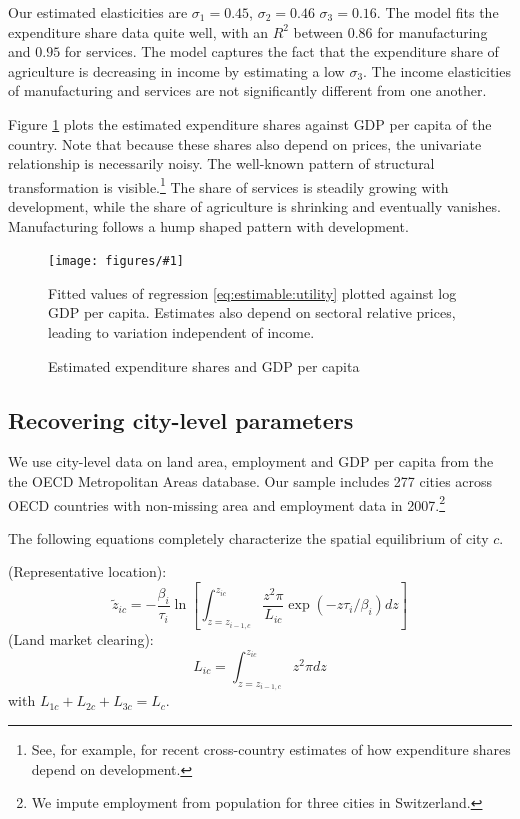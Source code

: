 \documentclass[12pt]{article}
\newcommand{\dofigure}[3]{\begin{figure}
\begin{centering}
\texttt{[image: figures/\#1]}
  \caption{#2\label{fig:#1}}
\end{centering}

\noindent \footnotesize{#3}
\end{figure}}
\begin{document}
Our estimated elasticities are $\sigma_1=0.45$, $\sigma_2=0.46$ $\sigma_3=0.16$. The model fits the expenditure share data quite well, with an $R^2$ between $0.86$ for manufacturing and $0.95$ for services. The model captures the fact that the expenditure share of agriculture is decreasing in income by estimating a low $\sigma_3$. The income elasticities of manufacturing and services are not significantly different from one another. 

Figure \ref{fig:city_level_inputs/expenditure_shares} plots the estimated expenditure shares against GDP per capita of the country. Note that because these shares also depend on prices, the univariate relationship is necessarily noisy. The well-known pattern of structural transformation is visible.\footnote{See, for example,  for recent cross-country estimates of how expenditure shares depend on development.} The share of services is steadily growing with development, while the share of agriculture is shrinking and eventually vanishes. Manufacturing follows a hump shaped pattern with development.

\dofigure{city_level_inputs/expenditure_shares}{Estimated expenditure shares and GDP per capita}{Fitted values of regression \eqref{eq:estimable:utility} plotted against log GDP per capita. Estimates also depend on sectoral relative prices, leading to variation independent of income.}

\subsection{Recovering city-level parameters}
We use city-level data on land area, employment and GDP per capita from the the OECD Metropolitan Areas database. Our sample includes 277 cities across OECD countries with non-missing area and employment data in 2007.\footnote{We impute employment from population for three cities in Switzerland.}

The following equations completely characterize the spatial equilibrium of city $c$.

(Representative location):
\begin{equation}\label{eq:representative_location}
	\tilde z_{ic}
	=
	- \frac {\beta_i}{\tau_i}
	\ln
	\left[
	\int_{z=z_{i-1,c}}^{z_{ic}}
		\frac {z^2\pi}{L_{ic}}
		\exp(-z \tau_i/\beta_i)
		dz
	\right]
\end{equation}
(Land market clearing):
\begin{equation}\label{eq:land_market_clearing}
	L_{ic}
	=
	\int_{z=z_{i-1,c}}^{z_{ic}}
		z^2\pi
		dz
\end{equation}
with $L_{1c}+L_{2c}+L_{3c}=L_c$.
\end{document}
